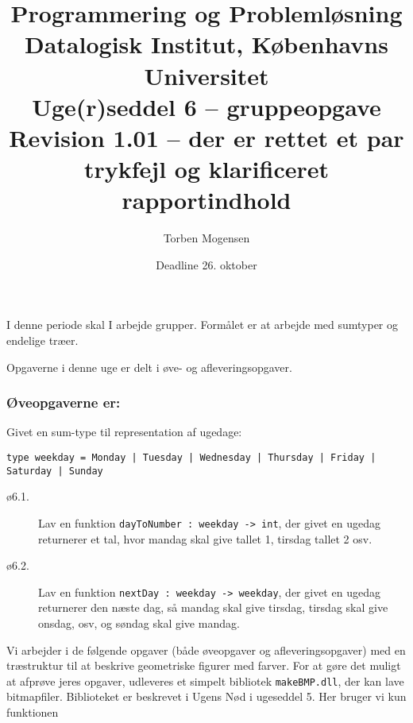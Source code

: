 \documentclass[a4paper]{article}
\begin{document}
\title{Programmering og Problemløsning\\
Datalogisk Institut, Københavns Universitet\\
Uge(r)seddel 6 -- gruppeopgave\\
Revision 1.01 -- der er rettet et par trykfejl og klarificeret rapportindhold}

\author{Torben Mogensen}
\date{Deadline 26. oktober}

\maketitle

\noindent
I denne periode skal I arbejde grupper.  Formålet er at arbejde
med sumtyper og endelige træer.


\vspace{1ex}

\noindent
Opgaverne i denne uge er delt i øve- og afleveringsopgaver.

\subsubsection*{Øveopgaverne er:}

Givet en sum-type til representation af ugedage:

\begin{verbatim}
type weekday = Monday | Tuesday | Wednesday | Thursday | Friday | Saturday | Sunday
\end{verbatim}

\begin{description}

\item[ø6.1.]

Lav en funktion \texttt{dayToNumber : weekday -> int}, der givet en
ugedag returnerer et tal, hvor mandag skal give tallet 1, tirsdag
tallet 2 osv.


\item[ø6.2.]

Lav en funktion \texttt{nextDay : weekday -> weekday}, der givet en
ugedag returnerer den næste dag, så mandag skal give tirsdag, tirsdag
skal give onsdag, osv, og søndag skal give mandag.

\end{description}


\noindent
Vi arbejder i de følgende opgaver (både øveopgaver og
afleveringsopgaver) med en træstruktur til at beskrive geometriske
figurer med farver.  For at gøre det muligt at afprøve jeres opgaver,
udleveres et simpelt bibliotek \texttt{makeBMP.dll}, der kan lave
bitmapfiler.  Biblioteket er beskrevet i Ugens Nød i ugeseddel 5.  Her
bruger vi kun funktionen
\end{document}
